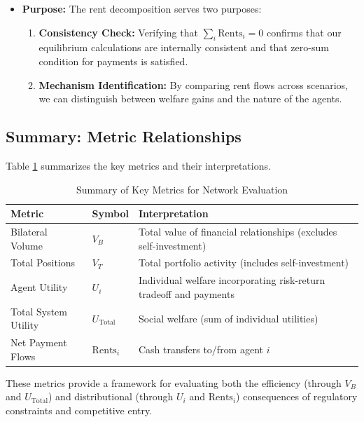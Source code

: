 \begin{itemize}
    This property serves as an internal consistency check for our calculations. Any deviation from zero indicates a computational error, as payments represent transfers within the system, not value creation or destruction.
    
    \item \textbf{Purpose:} The rent decomposition serves two purposes:
    \begin{enumerate}
        \item \textbf{Consistency Check:} Verifying that $\sum_i \text{Rents}_i = 0$ confirms that our equilibrium calculations are internally consistent and that zero-sum condition for payments is satisfied.
        
        \item \textbf{Mechanism Identification:} By comparing rent flows across scenarios, we can distinguish between welfare gains and the nature of the agents.
      
    \end{enumerate}
\end{itemize}

\subsection{Summary: Metric Relationships}

Table \ref{tab:metric_summary} summarizes the key metrics and their interpretations.

\begin{table}[h]
\centering
\caption{Summary of Key Metrics for Network Evaluation}
\label{tab:metric_summary}
\begin{tabular}{llp{7cm}}
\hline
\textbf{Metric} & \textbf{Symbol} & \textbf{Interpretation} \\ \hline
Bilateral Volume & $V_B$ & Total value of financial relationships (excludes self-investment) \\
Total Positions & $V_T$ & Total portfolio activity (includes self-investment) \\
Agent Utility & $U_i$ & Individual welfare incorporating risk-return tradeoff and payments \\
Total System Utility & $U_{\text{Total}}$ & Social welfare (sum of individual utilities) \\
Net Payment Flows & $\text{Rents}_i$ & Cash transfers to/from agent $i$  \\ \hline
\end{tabular}
\end{table}

These metrics provide a framework for evaluating both the efficiency (through $V_B$ and $U_{\text{Total}}$) and distributional (through $U_i$ and $\text{Rents}_i$) consequences of regulatory constraints and competitive entry.
